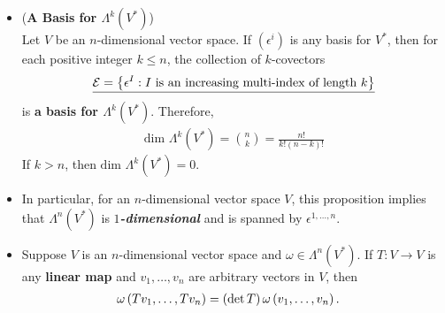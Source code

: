\documentclass[11pt]{article}
\begin{document}
\begin{itemize}
\item \begin{proposition}\label{prop: basis_alternating_tensor} (\textbf{A Basis for $\Lambda^k(V^{*})$})\\
Let $V$ be an $n$-dimensional vector space. If $(\epsilon^i)$ is any basis for $V^{*}$, then for each positive integer $k \le n$, the collection of $k$-covectors
\begin{align*}
\underline{\mathcal{E} = \left\{\epsilon^I: \text{$I$ is an increasing multi-index of length $k$}\right\}}
\end{align*} is \textbf{a basis for $\Lambda^k(V^{*})$}. Therefore,
\begin{align*}
\text{dim }\Lambda^k(V^{*}) = {n  \choose  k} = \frac{n!}{k! (n-k)!}
\end{align*} If $k > n$, then $\text{dim }\Lambda^k(V^{*}) = 0$.
\end{proposition}

\item \begin{remark}
In particular, for an $n$-dimensional vector space $V$, this proposition implies that $\Lambda^n(V^{*})$ is \emph{\textbf{$1$-dimensional}} and is spanned by $\epsilon^{1,\ldots,n}$.
\end{remark}

\item \begin{proposition} Suppose $V$ is an $n$-dimensional vector space and $\omega \in \Lambda^n(V^{*})$. If $T: V \rightarrow V$ is any \textbf{linear map} and $v_1, \ldots, v_n$ are arbitrary vectors in $V$, then
\begin{align}
\omega\left(Tv_1, \ldots, Tv_n\right) &= \left(\det{T}\right)\omega\left(v_1, \ldots, v_n\right). \label{eqn: k_covector_linear_map}
\end{align}
\end{proposition}
\end{itemize}
\end{document}
